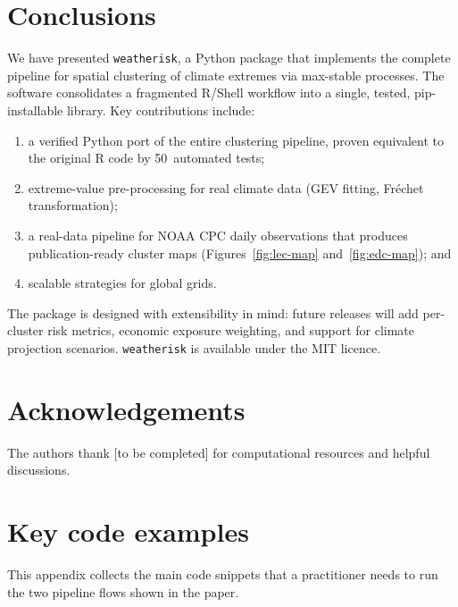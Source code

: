 \documentclass[preprint,12pt,a4paper]{elsarticle}
\begin{document}
\section{Conclusions}
\label{sec:conclusions}

We have presented \texttt{weatherisk}, a Python package that
implements the complete pipeline for spatial clustering of climate
extremes via max-stable processes.  The software consolidates a
fragmented R/Shell workflow into a single, tested, pip-installable
library.  Key contributions include:
\begin{enumerate}
\item a verified Python port of the entire clustering pipeline,
  proven equivalent to the original R code by 50~automated tests;
\item extreme-value pre-processing for real climate data (GEV
  fitting, Fr\'{e}chet transformation);
\item a real-data pipeline for NOAA CPC daily observations that
  produces publication-ready cluster maps
  (Figures~\ref{fig:lec-map} and~\ref{fig:edc-map}); and
\item scalable strategies for global grids.
\end{enumerate}
The package is designed with extensibility in mind: future releases
will add per-cluster risk metrics, economic exposure weighting, and
support for climate projection scenarios.  \texttt{weatherisk} is
available under the MIT licence.

\section*{Acknowledgements}

The authors thank [to be completed] for computational resources and
helpful discussions.

\appendix

\section{Key code examples}
\label{app:code}

This appendix collects the main code snippets that a practitioner
needs to run the two pipeline flows shown in the paper.
\end{document}
